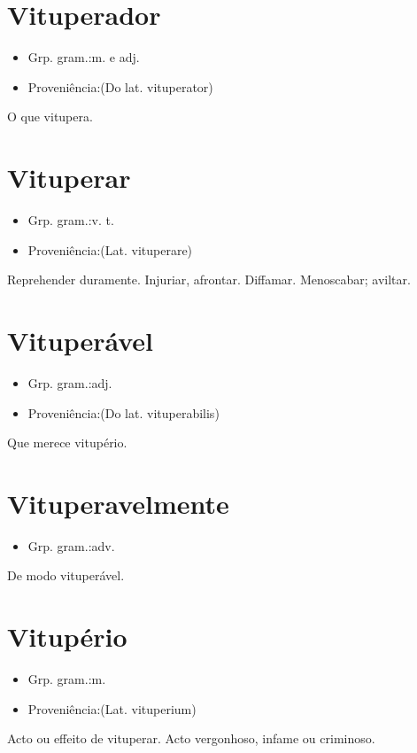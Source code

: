 \documentclass{article}
\begin{document}
\section{Vituperador}
\begin{itemize}
\item {Grp. gram.:m.  e  adj.}
\end{itemize}
\begin{itemize}
\item {Proveniência:(Do lat. \textunderscore vituperator\textunderscore )}
\end{itemize}
O que vitupera.
\section{Vituperar}
\begin{itemize}
\item {Grp. gram.:v. t.}
\end{itemize}
\begin{itemize}
\item {Proveniência:(Lat. \textunderscore vituperare\textunderscore )}
\end{itemize}
Reprehender duramente.
Injuriar, afrontar.
Diffamar.
Menoscabar; aviltar.
\section{Vituperável}
\begin{itemize}
\item {Grp. gram.:adj.}
\end{itemize}
\begin{itemize}
\item {Proveniência:(Do lat. \textunderscore vituperabilis\textunderscore )}
\end{itemize}
Que merece vitupério.
\section{Vituperavelmente}
\begin{itemize}
\item {Grp. gram.:adv.}
\end{itemize}
De modo vituperável.
\section{Vitupério}
\begin{itemize}
\item {Grp. gram.:m.}
\end{itemize}
\begin{itemize}
\item {Proveniência:(Lat. \textunderscore vituperium\textunderscore )}
\end{itemize}
Acto ou effeito de vituperar.
Acto vergonhoso, infame ou criminoso.
\end{document}
